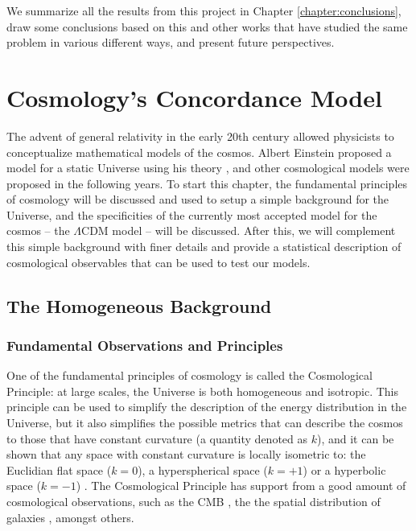\documentclass[openany,a4paper,12pt,oneside]{book}
\begin{document}
\begin{spacing}{1.5}
We summarize all the results from this project in Chapter \ref{chapter:conclusions}, draw some conclusions based on this and other works that have studied the same problem in various different ways, and present future perspectives.

\chapter{Cosmology's Concordance Model}\label{chapter:model}

The advent of general relativity in the early 20th century allowed physicists to conceptualize mathematical models of the cosmos. Albert Einstein proposed a model for a static Universe using his theory \cite{Einstein:1917ce}, and other cosmological models were proposed in the following years. To start this chapter, the fundamental principles of cosmology will be discussed and used to setup a simple background for the Universe, and the specificities of the currently most accepted model for the cosmos -- the $\Lambda$CDM model -- will be discussed. After this, we will complement this simple background with finer details and provide a statistical description of cosmological observables that can be used to test our models.

\section{The Homogeneous Background}

\subsection{Fundamental Observations and Principles}

One of the fundamental principles of cosmology is called the Cosmological Principle: at large scales, the Universe is both homogeneous and isotropic. This principle can be used to simplify the description of the energy distribution in the Universe, but it also simplifies the possible metrics that can describe the cosmos to those that have constant curvature (a quantity denoted as $k$), and it can be shown that any space with constant curvature is locally isometric to: the Euclidian flat space ($k=0$), a hyperspherical space ($k=+1$) or a hyperbolic space ($k=-1$) \cite{choquet2008general}. The Cosmological Principle has support from a good amount of cosmological observations, such as the CMB \cite{COBE}, the the spatial distribution of galaxies \cite{galaxy_isotropy, galaxy_homogeneity_Pandey_2021}, amongst others. 


\end{spacing}
\end{document}
